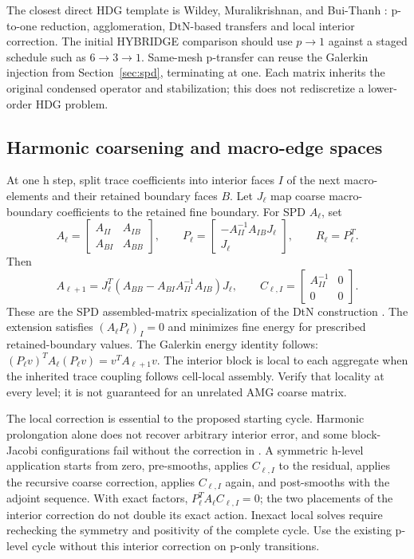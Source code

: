 \documentclass[11pt]{article}
\numberwithin{equation}{section}
\numberwithin{figure}{section}
\numberwithin{table}{section}
\begin{document}
The closest direct HDG template is Wildey, Muralikrishnan, and Bui-Thanh
\cite{wildey}: p-to-one reduction, agglomeration, DtN-based transfers and
local interior correction. The initial HYBRIDGE comparison should use
$p\to1$ against a staged schedule such as $6\to3\to1$. Same-mesh p-transfer
can reuse the Galerkin injection from Section~\ref{sec:spd}, terminating at
one. Each matrix inherits the original condensed operator and stabilization;
this does not rediscretize a lower-order HDG problem.

\subsection{Harmonic coarsening and macro-edge spaces}\label{sec:harmonic}
At one h step, split trace coefficients into interior faces $I$ of the next
macro-elements and their retained boundary faces $B$. Let $J_\ell$ map
coarse macro-boundary coefficients to the retained fine boundary. For SPD
$A_\ell$, set
\[
 A_\ell=\begin{bmatrix}A_{II}&A_{IB}\\A_{BI}&A_{BB}\end{bmatrix},\qquad
 P_\ell=\begin{bmatrix}-A_{II}^{-1}A_{IB}J_\ell\\J_\ell\end{bmatrix},
 \qquad R_\ell=P_\ell^T.
\]
Then
\[
 A_{\ell+1}=J_\ell^T
 (A_{BB}-A_{BI}A_{II}^{-1}A_{IB})J_\ell,\qquad
 C_{\ell,I}=\begin{bmatrix}A_{II}^{-1}&0\\0&0\end{bmatrix}.
\]
These are the SPD assembled-matrix specialization of the DtN construction
\cite{wildey}. The extension satisfies $(A_\ell P_\ell)_I=0$ and minimizes
fine energy for prescribed retained-boundary values. The Galerkin energy
identity follows: $(P_\ell v)^TA_\ell(P_\ell v)=v^TA_{\ell+1}v$.
The interior block is local to each aggregate when the inherited trace
coupling follows cell-local assembly. Verify that locality at every level;
it is not guaranteed for an unrelated AMG coarse matrix.

The local correction is essential to the proposed starting cycle. Harmonic
prolongation alone does not recover arbitrary interior error, and some
block-Jacobi configurations fail without the correction in \cite{wildey}.
A symmetric h-level application starts from zero, pre-smooths, applies
$C_{\ell,I}$ to the residual, applies the recursive coarse correction,
applies $C_{\ell,I}$ again, and post-smooths with the adjoint sequence.
With exact factors, $P_\ell^TA_\ell C_{\ell,I}=0$; the two placements of the
interior correction do not double its exact action. Inexact local solves
require rechecking the symmetry and positivity of the complete cycle.
Use the existing p-level cycle without this interior correction on p-only
transitions.
\end{document}
